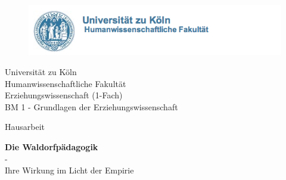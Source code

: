 \begin{titlepage}



\begin{figure}[!ht]
	\centering
		\includegraphics[natwidth=920pt, natheight=95pt, width=1.0\textwidth]{Bilder/LogoUni.png}


\end{figure}

\begin{center}

\vspace{0,8cm}

\begin{large}
Universität zu Köln\\
Humanwissenschaftliche Fakultät\\
Erziehungswissenschaft (1-Fach)\\
BM 1 - Grundlagen der Erziehungswissenschaft\\
\vspace{1cm}
\begin{scshape}
Hausarbeit\\ 
\end{scshape}
\end{large}


\vspace{1.5cm}

\begin{rmfamily}
\textbf{\huge Die Waldorfpädagogik}\\
\LARGE -\\
	Ihre Wirkung im Licht der Empirie\\
\normalsize
\end{rmfamily}

\vspace{1.7cm}
%


\end{center}
\end{titlepage}
